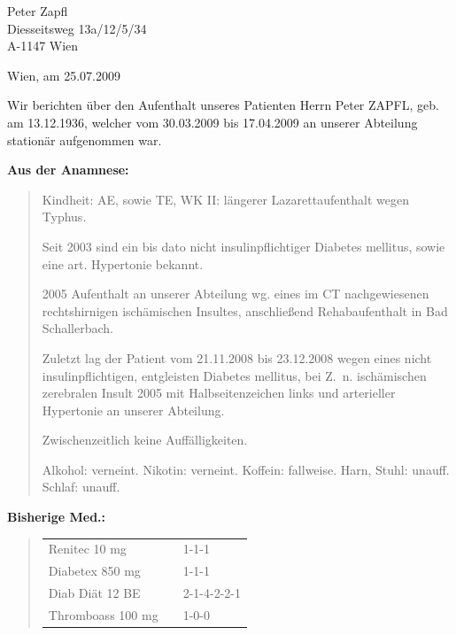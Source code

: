 {\selectfont                                                                                               

\vspace{1em}
                                                                                                                            


 Peter Zapfl\\
Diesseitsweg 13a/12/5/34 \\
A-1147 Wien
\vspace{1.5em}

\begin{flushright}
Wien, am 25.07.2009
\end{flushright}

  Wir berichten über den Aufenthalt unseres Patienten Herrn Peter ZAPFL, geb.
  am 13.12.1936, welcher vom 30.03.2009 bis 17.04.2009 an unserer Abteilung
  stationär aufgenommen war.

{\bfseries   Aus der Anamnese:}

\begin{quote}
  Kindheit: AE, sowie TE, WK II: längerer Lazarettaufenthalt
  wegen Typhus.
  
  Seit 2003 sind ein bis dato nicht insulinpflichtiger
  Diabetes mellitus, sowie eine art. Hypertonie bekannt.
  
  2005 Aufenthalt an unserer Abteilung wg. eines im
  CT nachgewiesenen rechtshirnigen
  ischämischen Insultes, anschließend Rehabaufenthalt in Bad
  Schallerbach.
  
  Zuletzt lag der Patient vom 21.11.2008 bis 23.12.2008
  wegen eines nicht insulinpflichtigen, entgleisten Diabetes
  mellitus, bei Z.~n. ischämischen zerebralen Insult 2005
  mit Halbseitenzeichen links und arterieller Hypertonie an
  unserer Abteilung.
  
  Zwischenzeitlich keine Auffälligkeiten.
  
  Alkohol: verneint. Nikotin: verneint. Koffein: fallweise.
  Harn, Stuhl: unauff.
  Schlaf: unauff.
\end{quote}


{\bfseries Bisherige Med.:} 

\begin{quote}
  \begin{tabular}{lll}
Renitec 10 mg &&1-1-1
\\
Diabetex 850 mg &&1-1-1
\\
Diab Diät 12 BE &&2-1-4-2-2-1
\\
Thromboass 100 mg &&1-0-0
\\
\end{tabular}
\end{quote}





}
